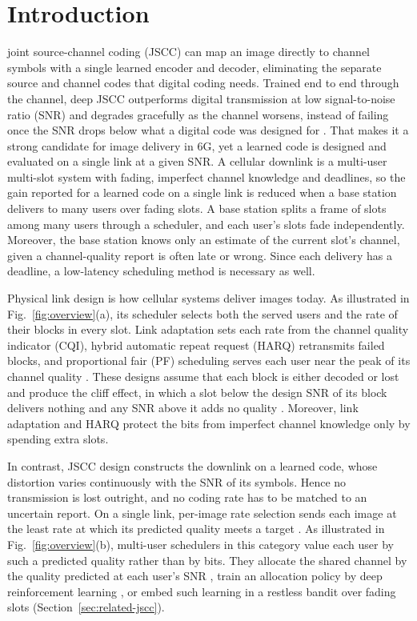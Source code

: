 \section{Introduction}
\label{sec:intro}

 joint source-channel coding (JSCC) can map an image directly to channel 
symbols with a single learned encoder and decoder, eliminating the separate source and channel codes 
that digital coding needs. Trained end to end through the channel, deep JSCC outperforms digital
transmission at low signal-to-noise ratio (SNR) and degrades gracefully as the channel worsens,
instead of failing once the SNR drops below what a digital code was designed for 
\cite{Bourtsoulatze19,Gunduz23}. That makes it a strong candidate for image delivery in 6G, yet a 
learned code is designed and evaluated on a single link at a given SNR. A cellular downlink is a 
multi-user multi-slot system with fading, imperfect channel knowledge and deadlines, so the gain 
reported for a learned code on a single link \cite{Bourtsoulatze19,Xu22,Yang25} is reduced when a 
base station delivers to many users over fading slots. A base station splits a frame of slots 
among many users through a scheduler, and each user's slots fade independently. Moreover, the base 
station knows only an estimate of the current slot's channel, given a channel-quality report 
\cite{TS36213} is often late or wrong. Since each delivery has a deadline, a low-latency scheduling 
method is necessary as well.

Physical link design is how cellular systems deliver images today. As illustrated in
Fig.~\ref{fig:overview}(a), its scheduler selects both the served users and the rate of their blocks 
in every slot. Link adaptation sets each rate from the channel quality indicator (CQI), hybrid 
automatic repeat request (HARQ) retransmits failed blocks, and proportional fair (PF) scheduling 
serves each user near the peak of its channel quality \cite{Goldsmith97,Caire01,Viswanath02}. 
These designs assume that each block is either decoded or lost and produce the cliff effect, in 
which a slot below the design SNR of its block delivers nothing and any SNR above it adds no quality 
\cite{Bourtsoulatze19,Gunduz23}. Moreover, link adaptation and HARQ protect the bits from imperfect 
channel knowledge only by spending extra slots.

In contrast, JSCC design constructs the downlink on a learned code, whose distortion varies 
continuously with the SNR of its symbols. Hence no transmission is lost outright, and no coding rate 
has to be matched to an uncertain report. On a single link, per-image rate selection sends each 
image at the least rate at which its predicted quality meets a target \cite{Zhang23}. As illustrated 
in Fig.~\ref{fig:overview}(b), multi-user schedulers in this category value each user by such a 
predicted quality rather than by bits. They allocate the shared channel by the quality predicted 
at each user's SNR \cite{Yan22,Xia24,Hou26}, train an allocation policy by deep reinforcement 
learning \cite{Wang22,Zhang23t}, or embed such learning in a restless bandit over fading slots
\cite{McDowell26} (Section~\ref{sec:related-jscc}).

